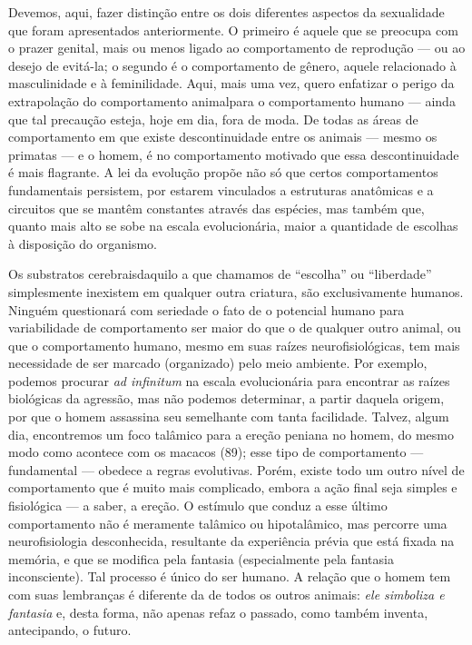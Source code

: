  Devemos, aqui, fazer distinção entre os dois diferentes aspectos da
sexualidade que foram apresentados anteriormente. O primeiro é aquele
que se preocupa com o prazer genital, mais ou menos ligado ao
comportamento de reprodução --- ou ao desejo de evitá-la; o segundo é o
comportamento de gênero,\idxiden{} aquele relacionado à masculinidade e à
feminilidade. Aqui, mais uma vez, quero enfatizar o perigo da
extrapolação do comportamento animal\idxanimvers[|(] para o comportamento humano ---
ainda que tal precaução esteja, hoje em dia, fora de moda. De todas as
áreas de comportamento em que existe descontinuidade entre os animais ---
 mesmo os primatas --- e o homem, é no comportamento motivado que essa
descontinuidade é mais flagrante. A lei da evolução propõe não só que
certos comportamentos fundamentais persistem, por estarem vinculados a
estruturas anatômicas e a circuitos que se mantêm constantes através
das espécies, mas também que, quanto mais alto se sobe na escala
evolucionária, maior a quantidade de escolhas à disposição do
organismo.

 Os substratos cerebrais\idxcereb[|(] daquilo a que chamamos de
``escolha'' ou ``liberdade'' simplesmente inexistem em
qualquer outra criatura, são exclusivamente humanos. Ninguém
questionará com seriedade o fato de o potencial humano para
variabilidade de comportamento ser maior do que o de qualquer outro
animal, ou que o comportamento humano, mesmo em suas raízes
neurofisiológicas, tem mais necessidade de ser marcado (organizado)
pelo meio ambiente. Por exemplo, podemos procurar \textit{ad infinitum}
na escala evolucionária para encontrar as raízes biológicas da
agressão,\idxagres{} mas não podemos determinar, a partir daquela origem, por que
o homem assassina seu semelhante com tanta facilidade. Talvez, algum
dia, encontremos um foco talâmico para a ereção peniana no homem, do
mesmo modo como acontece com os macacos (89); esse tipo de
comportamento --- fundamental --- obedece a regras evolutivas. Porém,
existe todo um outro nível de comportamento que é muito mais
complicado, embora a ação final seja simples e fisiológica --- a saber, a
ereção. O estímulo que conduz a esse último comportamento não é
meramente talâmico ou hipotalâmico, mas percorre uma neurofisiologia
desconhecida, resultante da experiência prévia que está fixada na
memória, e que se modifica pela fantasia\idxfanta{} (especialmente pela fantasia
inconsciente). Tal processo é único do ser humano. A relação que o
homem tem com suas lembranças é diferente da de todos os outros
animais: \textit{ele simboliza e fantasia} e, desta forma, não apenas
refaz o passado, como também inventa, antecipando, o futuro.

